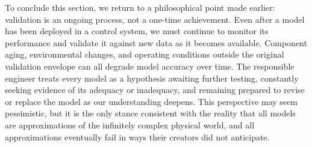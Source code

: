 To conclude this section, we return to a philosophical point made earlier: validation is an ongoing process, not a one-time achievement. Even after a model has been deployed in a control system, we must continue to monitor its performance and validate it against new data as it becomes available. Component aging, environmental changes, and operating conditions outside the original validation envelope can all degrade model accuracy over time. The responsible engineer treats every model as a hypothesis awaiting further testing, constantly seeking evidence of its adequacy or inadequacy, and remaining prepared to revise or replace the model as our understanding deepens. This perspective may seem pessimistic, but it is the only stance consistent with the reality that all models are approximations of the infinitely complex physical world, and all approximations eventually fail in ways their creators did not anticipate.
